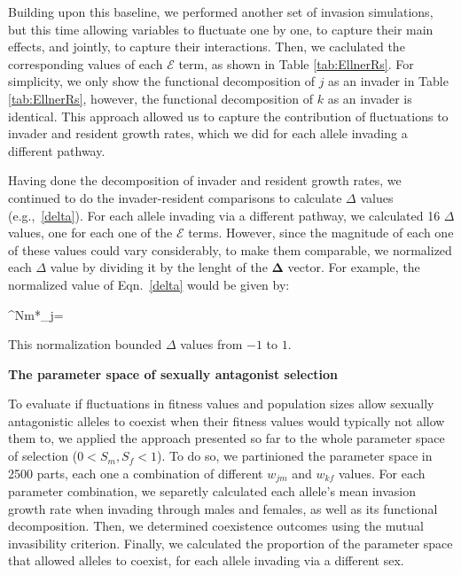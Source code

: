 \documentclass[12pt]{article}
\let\oldequation\equation
\let\oldendequation\endequation
\renewenvironment{equation}
  {\linenomathNonumbers\oldequation}
  {\oldendequation\endlinenomath}
\begin{document}
Building upon this baseline, we performed another set of invasion simulations, but this time allowing variables to fluctuate one by one, to capture their main effects, and jointly, to capture their interactions. Then, we  caclulated the corresponding values of each $\mathcal{E}$ term, as shown in Table \ref{tab:EllnerRs}. For simplicity, we only show the functional decomposition of $j$ as an invader in Table \ref{tab:EllnerRs}, however, the functional decomposition of $k$ as an invader is identical.  This approach allowed us to capture the contribution of fluctuations to invader and resident growth rates, which we did for each allele invading a different pathway.

Having done the decomposition of invader and resident growth rates, we continued to do the invader-resident comparisons to calculate $\Delta$ values (e.g.,~\ref{delta}). For each allele invading via a different pathway, we calculated 16 $\Delta$ values, one for each one of the $\mathcal{E}$ terms. However, since the magnitude of each one of these values could vary considerably, to make them comparable, we normalized each $\Delta$ value by dividing it by the lenght of the $\boldsymbol{\Delta}$ vector. For example, the normalized value of Eqn.~\ref{delta} would be given by:

\begin{equation}
  \Delta^{Nm*}_{j}= 
\end{equation}

This normalization bounded $\Delta$ values from $-1$ to $1$.

\vspace{5mm}
\noindent\textbf{The parameter space of sexually antagonist selection}



To evaluate if fluctuations in fitness values and population sizes allow sexually antagonistic alleles to coexist when their fitness values would typically not allow them to, we applied the approach presented so far to the whole parameter space of selection  ($ 0 < S_{m}, S_{f} < 1$). To do so, we partinioned the parameter space in 2500 parts, each one a combination of different $w_{jm}$ and $w_{kf}$ values. For each parameter combination, we  separetly calculated each allele's mean invasion growth rate when invading through males and females, as well as its functional decomposition. Then, we determined coexistence outcomes using the mutual invasibility criterion. Finally, we calculated the proportion of the parameter space that allowed alleles to coexist, for each allele invading via a different sex.
\end{document}
